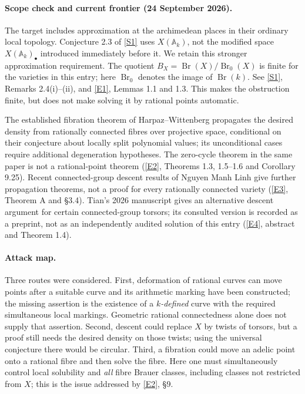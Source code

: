 \documentclass[11pt]{article}
\newcommand{\A}{\mathbb{A}}
\newcommand{\sref}[2]{\hyperlink{source:#1:#2}{[S#2]}}
\newcommand{\eref}[2]{\hyperlink{extra:#1:#2}{[E#2]}}
\begin{document}
\paragraph{Scope check and current frontier (24 September 2026).}
The target includes approximation at the archimedean places in their ordinary
local topology.  Conjecture 2.3 of \sref{30003827}{1} uses $X(\A_k)$, not the modified
space $X(\A_k)_\bullet$ introduced immediately before it.  We retain this stronger
approximation requirement.  The quotient
$B_X=\operatorname{Br}(X)/\operatorname{Br}_0(X)$ is finite for the varieties in
this entry; here $\operatorname{Br}_0$ denotes the image of
$\operatorname{Br}(k)$.  See \sref{30003827}{1}, Remarks 2.4(i)--(ii), and
\eref{30003827}{1}, Lemmas 1.1 and 1.3.
This makes the obstruction finite, but does not make solving it by rational
points automatic.

The established fibration theorem of Harpaz--Wittenberg propagates the desired
density from rationally connected fibres over projective space, conditional on
their conjecture about locally split polynomial values; its unconditional cases
require additional degeneration hypotheses.  The zero-cycle theorem in the
same paper is not a rational-point theorem
(\eref{30003827}{2}, Theorems 1.3, 1.5--1.6 and Corollary 9.25).
Recent connected-group descent results of Nguyen Manh Linh give further
propagation theorems, not a proof for every rationally connected variety
(\eref{30003827}{3}, Theorem A and \S3.4).
Tian's 2026 manuscript gives an alternative descent argument for certain
connected-group torsors; its consulted version is recorded as a preprint, not
as an independently audited solution of this entry (\eref{30003827}{4}, abstract
and Theorem 1.4).

\paragraph{Attack map.}
Three routes were considered.  First, deformation of rational curves can move
points after a suitable curve and its arithmetic marking have been constructed;
the missing assertion is the existence of a \emph{$k$-defined} curve with the
required simultaneous local markings.  Geometric rational connectedness alone
does not supply that assertion.  Second, descent could replace $X$ by twists
of torsors, but a proof still needs the desired density on those twists; using
the universal conjecture there would be circular.  Third, a fibration could
move an adelic point onto a rational fibre and then solve the fibre.  Here one
must simultaneously control local solubility and \emph{all} fibre Brauer
classes, including classes not restricted from $X$; this is the issue addressed
by \eref{30003827}{2}, \S9.
\end{document}
